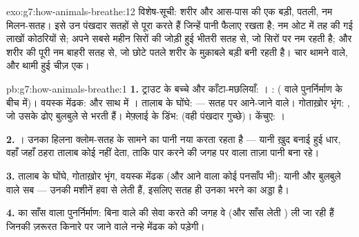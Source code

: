 \begin{solution}{exo:g7:how-animals-breathe:12}
विशेष-सूची: शरीर और आस-पास की एक बड़ी, पतली, नम मिलन-सतह।  इसे उन
पंखदार सतहों से पूरा करते हैं जिन्हें पानी फैलाए रखता है;  नम ओट
में तह की गई लाखों कोठरियों से;  अपने सबसे महीन सिरों की
जोड़ी हुई भीतरी सतह से, जो सिरों पर नम रहती है; और  शरीर की पूरी नम
बाहरी सतह से, जो छोटे पतले शरीर के मुक़ाबले बड़ी बनी रहती है। चार थामने
वाले, और थामी हुई चीज़ एक।
\end{solution}

\begin{solution}{pb:g7:how-animals-breathe:1}
\textbf{1.} ट्राउट के बच्चे और काँटा-मछलियाँ: । : 
( वाले पुनर्निर्माण के बीच में)। वयस्क मेंढक:  और साथ में
। तालाब के घोंघे:  --- सतह पर आने-जाने वाले। गोताख़ोर भृंग:
, जो उसके ढोए बुलबुले से भरती हैं। मेफ़्लाई के डिंभ: 
(वही पंखदार गुच्छे)। केंचुए: ।

\textbf{2.} । उनका हिलना क्लोम-सतह के सामने का पानी नया करता रहता
है --- यानी ख़ुद बनाई हुई धार, वहाँ जहाँ ठहरा तालाब कोई नहीं देता, ताकि
पार करने की जगह पर  वाला ताज़ा पानी बना रहे।

\textbf{3.} तालाब के घोंघे, गोताख़ोर भृंग, वयस्क मेंढक (और आने वाला कोई
पनसाँप भी): यानी  और बुलबुले वाले सब --- उनकी मशीनें  हवा
से लेती हैं, इसलिए सतह ही उनका भरने का अड्डा है।

\textbf{4.}  का साँस वाला पुनर्निर्माण: बिना  वाले 
की सेवा करते  की जगह वे  (और साँस लेती ) ली जा रही हैं
जिनकी ज़रूरत किनारे पर जाने वाले नन्हे मेंढक को पड़ेगी।


\end{solution}
